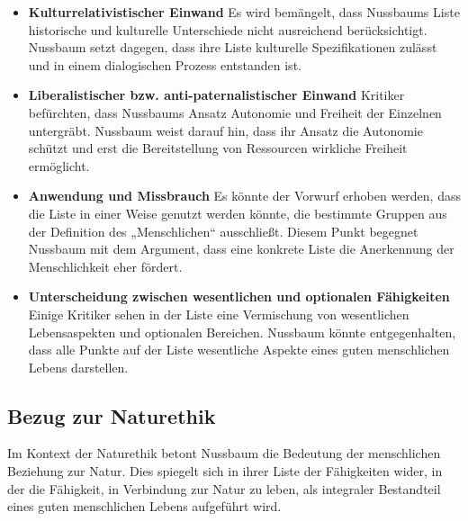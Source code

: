\documentclass{article}
\begin{document}
\begin{itemize}
	\item \textbf{Kulturrelativistischer Einwand}
	      Es wird bemängelt, dass Nussbaums Liste historische und kulturelle Unterschiede nicht ausreichend berücksichtigt. Nussbaum setzt dagegen, dass ihre Liste kulturelle Spezifikationen zulässt und in einem dialogischen Prozess entstanden ist.

	\item \textbf{Liberalistischer bzw. anti-paternalistischer Einwand}
	      Kritiker befürchten, dass Nussbaums Ansatz Autonomie und Freiheit der Einzelnen untergräbt. Nussbaum weist darauf hin, dass ihr Ansatz die Autonomie schützt und erst die Bereitstellung von Ressourcen wirkliche Freiheit ermöglicht.

	\item \textbf{Anwendung und Missbrauch}
	      Es könnte der Vorwurf erhoben werden, dass die Liste in einer Weise genutzt werden könnte, die bestimmte Gruppen aus der Definition des „Menschlichen“ ausschließt. Diesem Punkt begegnet Nussbaum mit dem Argument, dass eine konkrete Liste die Anerkennung der Menschlichkeit eher fördert.

	\item \textbf{Unterscheidung zwischen wesentlichen und optionalen Fähigkeiten}
	      Einige Kritiker sehen in der Liste eine Vermischung von wesentlichen Lebensaspekten und optionalen Bereichen. Nussbaum könnte entgegenhalten, dass alle Punkte auf der Liste wesentliche Aspekte eines guten menschlichen Lebens darstellen.
\end{itemize}

\subsection{Bezug zur Naturethik}

Im Kontext der Naturethik betont Nussbaum die Bedeutung der menschlichen Beziehung zur Natur. Dies spiegelt sich in ihrer Liste der Fähigkeiten wider, in der die Fähigkeit, in Verbindung zur Natur zu leben, als integraler Bestandteil eines guten menschlichen Lebens aufgeführt wird.
\end{document}
